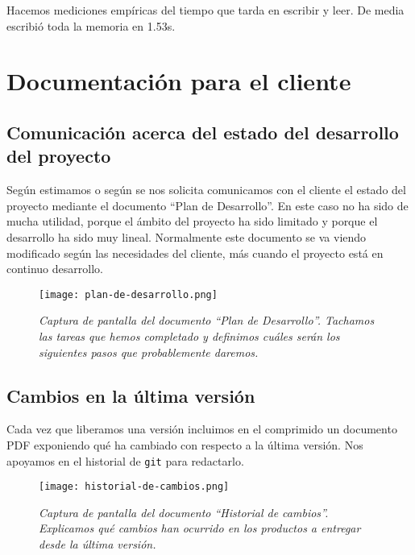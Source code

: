 Hacemos mediciones empíricas del tiempo que tarda en escribir y leer. De media escribió
toda la memoria en 1.53s.

\section{Documentación para el cliente}

\subsection{Comunicación acerca del estado del desarrollo del proyecto}

Según estimamos o según se nos solicita comunicamos con el cliente el
estado del proyecto mediante el documento ``Plan de Desarrollo''.
En este caso no ha sido de mucha utilidad, porque el ámbito del proyecto
ha sido limitado y porque el desarrollo ha sido muy lineal. Normalmente
este documento se va viendo modificado según las necesidades del cliente,
más cuando el proyecto está en continuo desarrollo.

\begin{figure}[!h]
    \centering
    \texttt{[image: plan-de-desarrollo.png]}
    \caption{\textit{Captura de pantalla del documento ``Plan de Desarrollo''.
    Tachamos las tareas que hemos completado y definimos cuáles serán los
    siguientes pasos que probablemente daremos.}}
\end{figure}

\subsection{Cambios en la última versión}

Cada vez que liberamos una versión incluimos en el comprimido un documento
PDF exponiendo qué ha cambiado con respecto a la última versión. Nos
apoyamos en el historial de \texttt{git} para redactarlo.

\begin{figure}[!h]
    \centering
    \texttt{[image: historial-de-cambios.png]}
    \caption{\textit{Captura de pantalla del documento ``Historial de cambios''.
            Explicamos qué cambios han ocurrido en los productos a entregar
            desde la última versión.}}
\end{figure}
